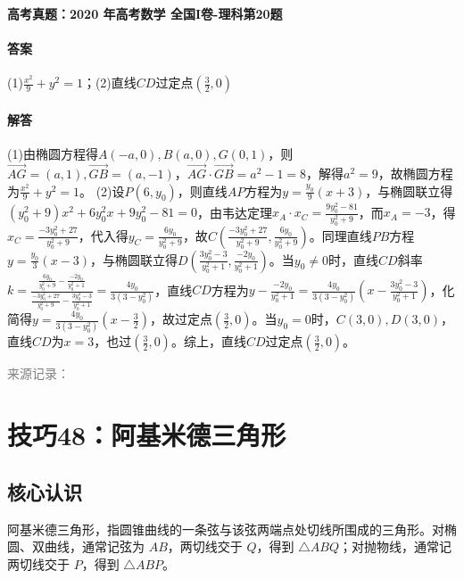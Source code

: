 \documentclass[UTF8,a4paper,11pt]{ctexart}
\newenvironment{gaokao}[1]{\par\medskip\noindent\textbf{高考真题：#1}\par\smallskip}{\par\medskip}
\begin{document}
\begin{gaokao}{2020 年高考数学 全国I卷-理科第20题}
\paragraph{答案}

(1)$\frac{x^2}{9}+y^2=1$；(2)直线$CD$过定点$\left(\frac{3}{2},0\right)$

\paragraph{解答}

(1)由椭圆方程得$A(-a,0),B(a,0),G(0,1)$，则$\overrightarrow{AG}=(a,1),\overrightarrow{GB}=(a,-1)$，$\overrightarrow{AG}\cdot\overrightarrow{GB}=a^2-1=8$，解得$a^2=9$，故椭圆方程为$\frac{x^2}{9}+y^2=1$。
(2)设$P(6,y_0)$，则直线$AP$方程为$y=\frac{y_0}{9}(x+3)$，与椭圆联立得$(y_0^2+9)x^2+6y_0^2x+9y_0^2-81=0$，由韦达定理$x_A\cdot x_C=\frac{9y_0^2-81}{y_0^2+9}$，而$x_A=-3$，得$x_C=\frac{-3y_0^2+27}{y_0^2+9}$，代入得$y_C=\frac{6y_0}{y_0^2+9}$，故$C\left(\frac{-3y_0^2+27}{y_0^2+9},\frac{6y_0}{y_0^2+9}\right)$。同理直线$PB$方程$y=\frac{y_0}{3}(x-3)$，与椭圆联立得$D\left(\frac{3y_0^2-3}{y_0^2+1},\frac{-2y_0}{y_0^2+1}\right)$。当$y_0\neq0$时，直线$CD$斜率$k=\frac{\frac{6y_0}{y_0^2+9}-\frac{-2y_0}{y_0^2+1}}{\frac{-3y_0^2+27}{y_0^2+9}-\frac{3y_0^2-3}{y_0^2+1}}=\frac{4y_0}{3(3-y_0^2)}$，直线$CD$方程为$y-\frac{-2y_0}{y_0^2+1}=\frac{4y_0}{3(3-y_0^2)}\left(x-\frac{3y_0^2-3}{y_0^2+1}\right)$，化简得$y=\frac{4y_0}{3(3-y_0^2)}\left(x-\frac{3}{2}\right)$，故过定点$\left(\frac{3}{2},0\right)$。当$y_0=0$时，$C(3,0),D(3,0)$，直线$CD$为$x=3$，也过$\left(\frac{3}{2},0\right)$。综上，直线$CD$过定点$\left(\frac{3}{2},0\right)$。

\par\smallskip\textcolor{gray}{\footnotesize 来源记录：\texttt{}}

\end{gaokao}

\clearpage

\section{技巧48：阿基米德三角形}

\subsection*{核心认识}

阿基米德三角形，指圆锥曲线的一条弦与该弦两端点处切线所围成的三角形。对椭圆、双曲线，通常记弦为 $AB$，两切线交于 $Q$，得到 $\triangle ABQ$；对抛物线，通常记两切线交于 $P$，得到 $\triangle ABP$。
\end{document}
